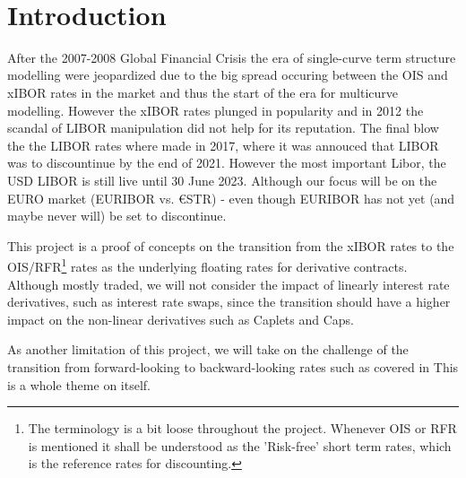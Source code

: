 \documentclass[12pt]{article}
\author{\textbf{\textsl{\flnavn}} \ \textbf{\textsl{\kuid}} \ \textbf{\textsl{\hold}}}
\title{\fag \\ \ku \\ \opg }
\date{}
\begin{document}
\maketitle
\pagebreak
\tableofcontents
\pagebreak
\section{Introduction} %
After the 2007-2008 Global Financial Crisis
the era of single-curve term structure modelling
were jeopardized due to the
big spread occuring between the
OIS and xIBOR rates in the market
and thus the start of the era for multicurve modelling.
However the xIBOR rates plunged in popularity
and in 2012 the scandal of LIBOR manipulation
did not help for its reputation. The final
blow the the LIBOR rates where made in 2017,
where it was annouced that LIBOR was
to discountinue by the end of 2021. However the most important
Libor, the USD LIBOR is still live until 30 June 2023.
Although our focus will be on the EURO market (EURIBOR vs. €STR) -
even though EURIBOR has not yet (and maybe never will) be set to discontinue.\newline

This project is a proof of concepts on the
transition from the xIBOR rates to the OIS/RFR\footnote{The
terminology is a bit loose throughout the project. Whenever
OIS or RFR is mentioned it shall be understood
as the 'Risk-free' short term rates, which
is the reference rates for discounting.} rates
as the underlying floating rates for derivative contracts.
Although mostly traded, we will not consider the impact
of linearly interest rate derivatives, such as interest rate swaps,
since the transition should have a higher impact on
the non-linear derivatives such as Caplets and Caps.\linebreak

As another limitation of this project, we will
take on the challenge of the transition from forward-looking
to backward-looking rates such as covered in \cite{LyaMer2019FMM}
This is a whole theme on itself.
\end{document}
